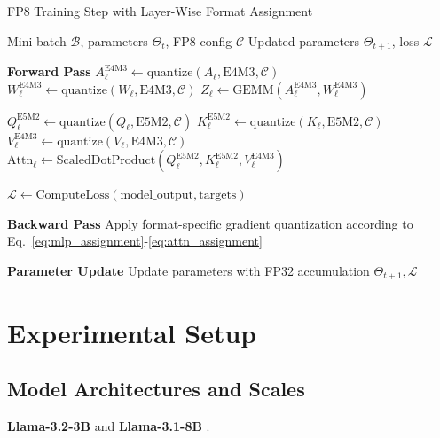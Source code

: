 \documentclass[conference]{IEEEtran}
\begin{document}
\begin{algorithm}[hbt!]
\caption{FP8 Training Step with Layer-Wise Format Assignment}
\label{alg:fp8_training}
\begin{algorithmic}
\Require Mini-batch $\mathcal{B}$, parameters $\Theta_t$, FP8 config $\mathcal{C}$
\Ensure Updated parameters $\Theta_{t+1}$, loss $\mathcal{L}$

\State \textbf{Forward Pass}
  \State $A_\ell^{\text{E4M3}} \gets \text{quantize}(A_{\ell}, \text{E4M3}, \mathcal{C})$
  \State $W_\ell^{\text{E4M3}} \gets \text{quantize}(W_{\ell}, \text{E4M3}, \mathcal{C})$
  \State $Z_\ell \gets \text{GEMM}(A_\ell^{\text{E4M3}}, W_\ell^{\text{E4M3}})$
\EndFor

  \State $Q_\ell^{\text{E5M2}} \gets \text{quantize}(Q_{\ell}, \text{E5M2}, \mathcal{C})$
  \State $K_\ell^{\text{E5M2}} \gets \text{quantize}(K_{\ell}, \text{E5M2}, \mathcal{C})$
  \State $V_\ell^{\text{E4M3}} \gets \text{quantize}(V_{\ell}, \text{E4M3}, \mathcal{C})$
  \State $\text{Attn}_\ell \gets \text{ScaledDotProduct}(Q_\ell^{\text{E5M2}}, K_\ell^{\text{E5M2}}, V_\ell^{\text{E4M3}})$
\EndFor

\State $\mathcal{L} \gets \text{ComputeLoss}(\text{model\_output}, \text{targets})$

\State \textbf{Backward Pass}
\State Apply format-specific gradient quantization according to Eq.~\ref{eq:mlp_assignment}-\ref{eq:attn_assignment}

\State \textbf{Parameter Update}
\State Update parameters with FP32 accumulation
\State \Return $\Theta_{t+1}, \mathcal{L}$
\end{algorithmic}
\end{algorithm}


\section{Experimental Setup}

\subsection{Model Architectures and Scales}
\textbf{Llama-3.2-3B} \cite{meta2024llama3.2} and \textbf{Llama-3.1-8B} \cite{meta2024llama3.1}.
\end{document}
